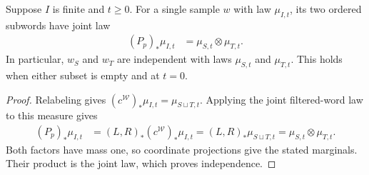 \begin{theorem}
\label{thm:poisson_word_partition}
\leanok
{}
Suppose $I$ is finite and $t\geq0$. For a single sample $w$ with law
$\mu_{I,t}$, its two ordered subwords have joint law
\begin{align}
 (P_p)_*\mu_{I,t}&=\mu_{S,t}\otimes\mu_{T,t}.
 \label{eq:poisson_partition_law}
\end{align}
In particular, $w_S$ and $w_T$ are independent with laws $\mu_{S,t}$ and
$\mu_{T,t}$. This holds when either subset is empty and at $t=0$.
\end{theorem}
\begin{proof}
\leanok
{}
Relabeling gives $(c^{\mathcal W})_*\mu_{I,t}=\mu_{S\sqcup T,t}$.
Applying the joint filtered-word law to this measure gives
\begin{align}
 (P_p)_*\mu_{I,t}
 &=(L,R)_*(c^{\mathcal W})_*\mu_{I,t}
  =(L,R)_*\mu_{S\sqcup T,t}
  =\mu_{S,t}\otimes\mu_{T,t}.
\end{align}
Both factors have mass one, so coordinate projections give the stated
marginals. Their product is the joint law, which proves independence.
\end{proof}

